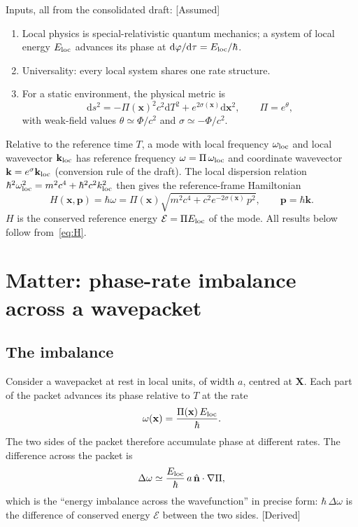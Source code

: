\documentclass[11pt]{article}
\newcommand{\Pg}{\Pi}
\newcommand{\thP}{\theta}
\newcommand{\sgP}{\sigma}
\newcommand{\Eloc}{E_{\rm loc}}
\newcommand{\Eref}{\mathcal{E}}
\newcommand{\dd}{\mathrm{d}}
\newcommand{\st}[1]{\textsf{\small[#1]}}
\theoremstyle{plain}
\theoremstyle{remark}
\begin{document}
Inputs, all from the consolidated draft: \st{Assumed}
\begin{enumerate}[I1.]
\item Local physics is special-relativistic quantum mechanics; a system of local energy $\Eloc$ advances its phase at $\dd\varphi/\dd\tau=\Eloc/\hbar$.
\item Universality: every local system shares one rate structure.
\item For a static environment, the physical metric is
\begin{equation}
\dd s^2=-\Pg(\mathbf x)^2c^2\dd T^2+e^{2\sgP(\mathbf x)}\dd\mathbf x^2,
\qquad \Pg=e^{\thP},
\label{eq:metric}
\end{equation}
with weak-field values $\thP\simeq\Phi/c^2$ and $\sgP\simeq-\Phi/c^2$.
\end{enumerate}
Relative to the reference time $T$, a mode with local frequency $\omega_{\rm loc}$ and local wavevector $\mathbf k_{\rm loc}$ has reference frequency $\omega=\Pg\,\omega_{\rm loc}$ and coordinate wavevector $\mathbf k=e^{\sgP}\mathbf k_{\rm loc}$ (conversion rule of the draft). The local dispersion relation $\hbar^2\omega_{\rm loc}^2=m^2c^4+\hbar^2c^2k_{\rm loc}^2$ then gives the reference-frame Hamiltonian
\begin{equation}
H(\mathbf x,\mathbf p)=\hbar\omega=\Pg(\mathbf x)\sqrt{m^2c^4+c^2e^{-2\sgP(\mathbf x)}\,p^2},
\qquad \mathbf p=\hbar\mathbf k .
\label{eq:H}
\end{equation}
$H$ is the conserved reference energy $\Eref=\Pg\Eloc$ of the mode. All results below follow from~\eqref{eq:H}.

\section{Matter: phase-rate imbalance across a wavepacket}
\label{sec:matter}

\subsection{The imbalance}

Consider a wavepacket at rest in local units, of width $a$, centred at $\mathbf X$. Each part of the packet advances its phase relative to $T$ at the rate
\begin{equation}
\omega(\mathbf x)=\frac{\Pg(\mathbf x)\,\Eloc}{\hbar}.
\end{equation}
The two sides of the packet therefore accumulate phase at different rates. The difference across the packet is
\begin{equation}
\Delta\omega\simeq\frac{\Eloc}{\hbar}\,a\,\hat{\mathbf n}\cdot\nabla\Pg ,
\end{equation}
which is the ``energy imbalance across the wavefunction'' in precise form: $\hbar\,\Delta\omega$ is the difference of conserved energy $\Eref$ between the two sides. \st{Derived}
\end{document}
